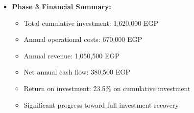 \begin{itemize}
    \item \textbf{Phase 3 Financial Summary:}
    \begin{itemize}
        \item Total cumulative investment: 1,620,000 EGP
        \item Annual operational costs: 670,000 EGP
        \item Annual revenue: 1,050,500 EGP
        \item Net annual cash flow: 380,500 EGP
        \item Return on investment: 23.5\% on cumulative investment
        \item Significant progress toward full investment recovery
    \end{itemize}
\end{itemize}

